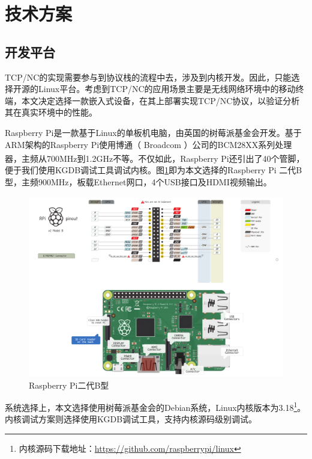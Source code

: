 \section{技术方案}
\subsection{开发平台}
TCP/NC的实现需要参与到协议栈的流程中去，涉及到内核开发。因此，只能选择开源的Linux平台。考虑到TCP/NC的应用场景主要是无线网络环境中的移动终端，本文决定选择一款嵌入式设备，在其上部署实现TCP/NC协议，以验证分析其在真实环境中的性能。
\par
Raspberry Pi是一款基于Linux的单板机电脑，由英国的树莓派基金会开发。基于ARM架构的Raspberry Pi使用博通（ Broadcom ）公司的BCM28XX系列处理器，主频从700MHz到1.2GHz不等\textsuperscript{\cite{rasp}}。不仅如此，Raspberry Pi还引出了40个管脚，便于我们使用KGDB调试工具调试内核。图\ref{RASP_EPS}即为本文选择的Raspberry Pi 二代B型，主频900MHz，板载Ethernet网口，4个USB接口及HDMI视频输出。
\begin{figure}[htbp]
	\centering
\includegraphics[width=6in]{figures/rasp.pdf}
\caption{Raspberry Pi二代B型}
\label{RASP_EPS}
\end{figure}
系统选择上，本文选择使用树莓派基金会的Debian系统，Linux内核版本为3.18\footnote{内核源码下载地址：\url{https://github.com/raspberrypi/linux}}。内核调试方案则选择使用KGDB调试工具，支持内核源码级别调试。
